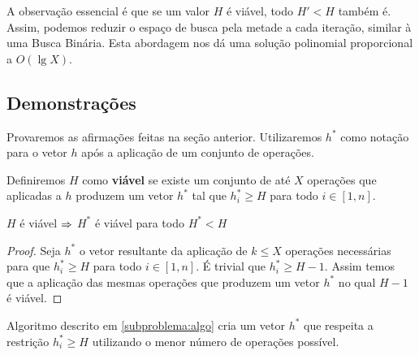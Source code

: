 A observação essencial é que se um valor $H$ é viável, todo $H' < H$ também é. Assim, podemos reduzir o espaço de busca pela metade a cada iteração, similar à uma Busca Binária. Esta abordagem nos dá uma solução polinomial proporcional a $O(\lg X)$.

\subsection*{Demonstrações}

Provaremos as afirmações feitas na seção anterior. Utilizaremos $h^*$ como notação para o vetor $h$ após a aplicação de um conjunto de operações.

Definiremos $H$ como \textbf{viável} se existe um conjunto de até $X$ operações que aplicadas a $h$ produzem um vetor $h^*$ tal que $h^*_i \geq H$ para todo $i \in [1, n]$.

\begin{prop}
    $H$ é viável $\Rightarrow$ $H^*$ é viável para todo $H^* < H$
\end{prop}

\begin{proof}
    Seja $h^*$ o vetor resultante da aplicação de $k \leq X$ operações necessárias para que $h^*_i \geq H$ para todo $i \in [1, n]$. É trivial que $h^*_i \geq H - 1$. Assim temos que a aplicação das mesmas operações que produzem um vetor $h^*$ no qual $H - 1$ é viável.
\end{proof}

\begin{prop}
    Algoritmo descrito em \ref{subproblema:algo} cria um vetor $h^*$ que respeita a restrição $h^*_i \geq H$ utilizando o menor número de operações possível.
\end{prop}

